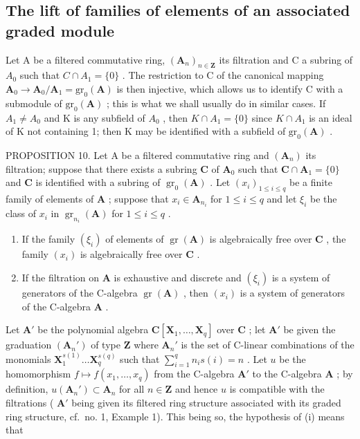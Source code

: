 \subsection{The lift of families of elements of an associated graded module}

Let A be a filtered commutative ring, \((\mathbf{A}_{n})_{n\in\mathbf{Z}}\) its filtration and C a subring of \(A_{0}\) such that \(C\cap A_{1}=\{0\}\) . The restriction to C of the canonical mapping \(\mathbf{A}_{0}\to\mathbf{A}_{0}/\mathbf{A}_{1}=\mathrm{gr}_{0}(\mathbf{A})\) is then injective, which allows us to identify C with a submodule of \(\mathrm{gr}_{0}(\mathbf{A})\) ; this is what we shall usually do in similar cases. If \(A_{1}\neq A_{0}\) and K is any subfield of \(A_{0}\) , then \(K\cap A_{1}=\{0\}\) since \(K\cap A_{1}\) is an ideal of K not containing 1; then K may be identified with a subfield of \(\mathrm{gr}_{0}(\mathbf{A})\) .

PROPOSITION 10. Let A be a filtered commutative ring and \((\mathbf{A}_n)\) its filtration; suppose that there exists a subring \(\mathbf{C}\) of \(\mathbf{A}_0\) such that \(\mathbf{C} \cap \mathbf{A}_1 = \{0\}\) and \(\mathbf{C}\) is identified with a subring of \(\operatorname{gr}_0(\mathbf{A})\) . Let \((x_i)_{1 \leqslant i \leqslant q}\) be a finite family of elements of \(\mathbf{A}\) ; suppose that \(x_i \in \mathbf{A}_{n_i}\) for \(1 \leqslant i \leqslant q\) and let \(\xi_i\) be the class of \(x_i\) in \(\operatorname{gr}_{n_i}(\mathbf{A})\) for \(1 \leqslant i \leqslant q\) .

\begin{enumerate}
\def\labelenumi{(\roman{enumi})}
\item
  If the family \((\xi_{i})\) of elements of \(\operatorname{gr}(\mathbf{A})\) is algebraically free over \(\mathbf{C}\) , the family \((x_{i})\) is algebraically free over \(\mathbf{C}\) .
\item
  If the filtration on \(\mathbf{A}\) is exhaustive and discrete and \((\xi_{i})\) is a system of generators of the C-algebra \(\operatorname{gr}(\mathbf{A})\) , then \((x_{i})\) is a system of generators of the C-algebra \(\mathbf{A}\) .
\end{enumerate}

Let \(\mathbf{A}'\) be the polynomial algebra \(\mathbf{C}[\mathbf{X}_1, \ldots, \mathbf{X}_q]\) over \(\mathbf{C}\) ; let \(\mathbf{A}'\) be given the graduation \((\mathbf{A}_n')\) of type \(\mathbf{Z}\) where \(\mathbf{A}_n'\) is the set of C-linear combinations of the monomials \(\mathbf{X}_1^{s(1)} \ldots \mathbf{X}_q^{s(q)}\) such that \(\sum_{i=1}^{q} n_i s(i) = n\) . Let \(u\) be the homomorphism \(f \mapsto f(x_1, \ldots, x_q)\) from the C-algebra \(\mathbf{A}'\) to the C-algebra \(\mathbf{A}\) ; by definition, \(u(\mathbf{A}_n') \subset \mathbf{A}_n\) for all \(n \in \mathbf{Z}\) and hence \(u\) is compatible with the filtrations ( \(\mathbf{A}'\) being given its filtered ring structure associated with its graded ring structure, cf.~no. 1, Example 1). This being so, the hypothesis of (i) means that

